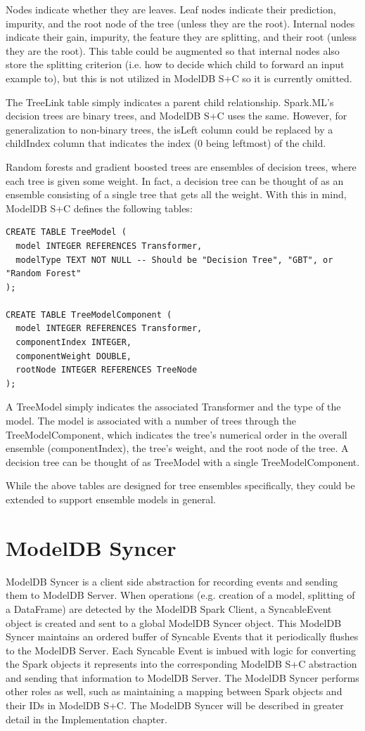 Nodes indicate whether they are leaves. Leaf nodes indicate their prediction, 
impurity, and the root node of the tree (unless they are the root). 
Internal nodes indicate their gain, impurity, the feature they are splitting, 
and their root (unless they are the root). This table could be augmented so
that internal nodes also store the splitting criterion (i.e. how to decide which
child to forward an input example to), but this is not utilized in ModelDB S+C so
it is currently omitted. 

The TreeLink table simply indicates a parent child relationship. Spark.ML's 
decision trees are binary trees, and ModelDB S+C uses the same. However, for 
generalization to non-binary trees, the isLeft column could be replaced by a childIndex
column that indicates the index (0 being leftmost) of the child.

Random forests and gradient boosted trees are ensembles of decision trees, where
each tree is given some weight. In fact, a decision tree can be thought of as an
ensemble consisting of a single tree that gets all the weight. With this in mind, ModelDB S+C
defines the following tables:

\begin{verbatim}
CREATE TABLE TreeModel (
  model INTEGER REFERENCES Transformer,
  modelType TEXT NOT NULL -- Should be "Decision Tree", "GBT", or "Random Forest"
);

CREATE TABLE TreeModelComponent (
  model INTEGER REFERENCES Transformer,
  componentIndex INTEGER,
  componentWeight DOUBLE,
  rootNode INTEGER REFERENCES TreeNode
);
\end{verbatim}

A TreeModel simply indicates the associated Transformer and the type of the model.
The model is associated with a number of trees through the TreeModelComponent, which
indicates the tree's numerical order in the overall ensemble (componentIndex), the
tree's weight, and the root node of the tree. A decision tree can be thought of as
TreeModel with a single TreeModelComponent.

While the above tables are designed for tree ensembles specifically, they could be
extended to support ensemble models in general.

\section{ModelDB Syncer}
ModelDB Syncer is a client side abstraction for recording events and sending them
to ModelDB Server. When operations (e.g. creation of a model, splitting of a DataFrame)
are detected by the ModelDB Spark Client, a SyncableEvent object is created and sent to
a global ModelDB Syncer object. This ModelDB Syncer maintains an ordered buffer of Syncable Events
that it periodically flushes to the ModelDB Server. Each Syncable Event is imbued with logic for converting
the Spark objects it represents into the corresponding ModelDB S+C abstraction and sending that information to
ModelDB Server. The ModelDB Syncer performs other roles as well, such as maintaining a mapping between Spark
objects and their IDs in ModelDB S+C. The ModelDB Syncer will be described in greater detail in the Implementation chapter.
